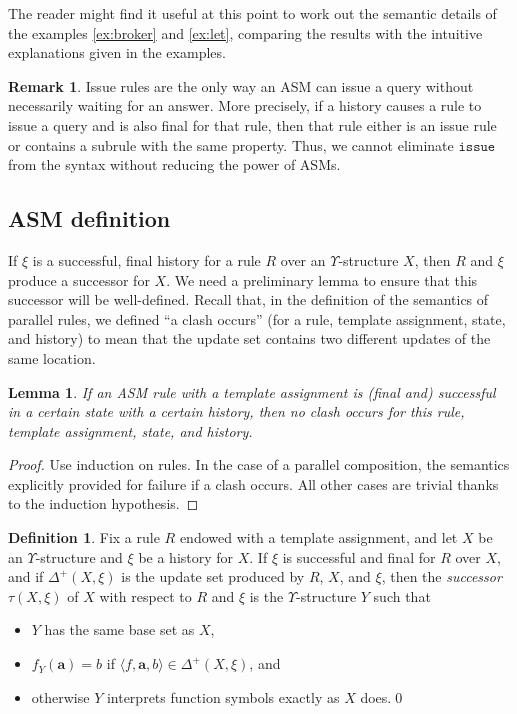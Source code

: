 \documentclass{LMCS}
\newtheorem{la}[thm]{Lemma}
\theoremstyle{definition}
\newtheorem{df}[thm]{Definition}
\newtheorem{rmk}[thm]{Remark}
\newenvironment{ls}{\begin{itemize}}{\end{itemize}}
\newcommand{\DD}{\Delta^+}
\newcommand{\U}{\Upsilon}
\newcommand{\bld}[1]{\ensuremath{\mathbf {#1}}}
\newcommand{\sq}[1]{\ensuremath{\langle#1\rangle}}
\newcommand{\ttt}[1]{\ensuremath{\mathtt {#1}}}
\begin{document}
The reader might find it useful at this point to work out the
semantic details of the examples \ref{ex:broker} and \ref{ex:let},
comparing the results with the intuitive explanations given in the
examples.

\begin{rmk}
  Issue rules are the only way an ASM can issue a query without
  necessarily waiting for an answer.  More precisely, if a history
  causes a rule to issue a query and is also final for that rule, then
  that rule either is an issue rule or contains a subrule with the
  same property.  Thus, we cannot eliminate \ttt{issue} from the
  syntax without reducing the power of ASMs.
\end{rmk}

\subsection{ASM definition}

If $\xi$ is a successful, final history for a rule $R$ over an
$\U$-structure $X$, then $R$ and $\xi$ produce a successor for $X$.
We need a preliminary lemma to ensure that this successor will be
well-defined.  Recall that, in the definition of the semantics of
parallel rules, we defined ``a clash occurs'' (for a rule, template
assignment, state, and history) to mean that the update set contains
two different updates of the same location.

\begin{la}   \label{no-clash}
  If an ASM rule with a template assignment is (final and) successful
  in a certain state with a certain history, then no clash occurs for
  this rule, template assignment, state, and history.  
\end{la}

\begin{proof}
Use induction on rules.  In the case of a parallel composition, the
semantics explicitly provided for failure if a clash occurs.  All
other cases are trivial thanks to the induction hypothesis.
\end{proof}

\begin{df} \label{asm-next_state}
Fix a rule $R$ endowed with a template assignment, and let $X$ be an
$\U$-structure and $\xi$ be a history for $X$.  If $\xi$ is successful and
final for $R$ over $X$, and if $\DD(X,\xi)$ is the update set produced by
$R$, $X$, and $\xi$, then the \emph{successor} $\tau(X,\xi)$ of $X$ with
respect to $R$ and $\xi$ is the $\U$-structure $Y$ such that
\begin{ls}
  \item $Y$ has the same base set as $X$,
  \item $f_Y(\bld a)=b$ if $\sq{f,\bld a,b}\in\DD(X,\xi)$, and
  \item otherwise $Y$ interprets function symbols exactly as $X$ does.\qed
\end{ls}
\end{df}
\end{document}
